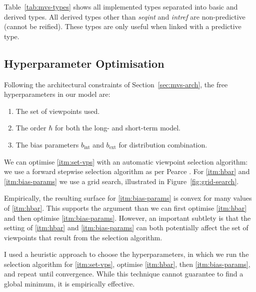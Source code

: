 \documentclass[12pt,a4paper,twoside,openright]{report}
\newcommand{\sref}[1]{Section~\ref{#1}}
\begin{document}
Table~\ref{tab:mvs-types} shows all implemented types separated into basic and
derived types. All derived types other than \emph{seqint} and \emph{intref} are
non-predictive (cannot be reified). These types are only useful when linked with
a predictive type.

\subsection{Hyperparameter Optimisation}\label{sec:mvs-hyperparams}

Following the architectural constraints of \sref{sec:mvs-arch}, the
free hyperparameters in our model are:
\begin{enumerate}[label=(\arabic*), itemsep=0mm]
  \item The set of viewpoints used. \label{itm:set-vps}
  \item The order $\hbar$ for both the long- and short-term
    model. \label{itm:hbar}
  \item The bias parameters $b_{\mathrm{int}}$ and $b_{\mathrm{ext}}$ for
    distribution combination.
    \label{itm:bias-params}
\end{enumerate}

We can optimise \ref{itm:set-vps} with an automatic viewpoint selection
algorithm: we use a forward stepwise selection algorithm as per Pearce
\cite{pearce2005construction}. For \ref{itm:hbar} and \ref{itm:bias-params} we
use a grid search, illustrated in Figure~\ref{fig:grid-search}. 

Empirically, the resulting surface for \ref{itm:bias-params} is convex for many
values of \ref{itm:hbar}. This supports the argument than we can first optimise
\ref{itm:hbar} and then optimise \ref{itm:bias-params}. However, an important
subtlety is that the setting of \ref{itm:hbar} and \ref{itm:bias-params} can
both potentially affect the set of viewpoints that result from the selection
algorithm.

I used a heuristic approach to choose the hyperparameters, in which we run the
selection algorithm for \ref{itm:set-vps}, optimise \ref{itm:hbar}, then
\ref{itm:bias-params}, and repeat until convergence. While this technique cannot
guarantee to find a global minimum, it is empirically effective.
\end{document}
